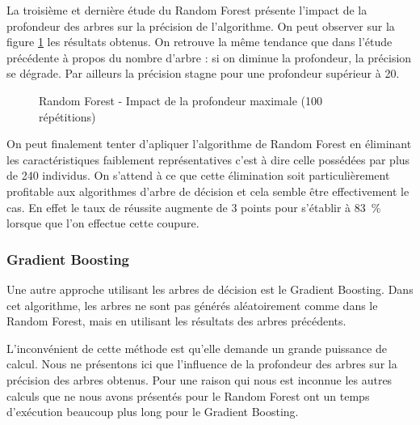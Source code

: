 \documentclass[11pt,a4paper]{article}
\begin{document}
			La troisième et dernière étude du Random Forest présente l'impact de la profondeur des arbres sur la précision de l'algorithme. On peut observer sur la figure \ref{rf_depth} les résultats obtenus. On retrouve la même tendance que dans l'étude précédente à propos du nombre d'arbre : si on diminue la profondeur, la précision se dégrade. Par ailleurs la précision stagne pour une profondeur supérieur à 20.

			\begin{figure}
				\begin{center}
					\caption{Random Forest - Impact de la profondeur maximale (100 répétitions)}
					\label{rf_depth}
				\end{center}
			\end{figure}

			On peut finalement tenter d'apliquer l'algorithme de Random Forest en éliminant les caractéristiques faiblement représentatives c'est à dire celle possédées par plus de 240 individus. On s'attend à ce que cette élimination soit particulièrement profitable aux algorithmes d'arbre de décision et cela semble être effectivement le cas. En effet le taux de réussite augmente de 3 points pour s'établir à \SI{83}{\percent} lorsque que l'on effectue cette coupure.

		\subsubsection{Gradient Boosting}

			Une autre approche utilisant les arbres de décision est le Gradient Boosting. Dans cet algorithme, les arbres ne sont pas générés aléatoirement comme dans le Random Forest, mais en utilisant les résultats des arbres précédents.

			L'inconvénient de cette méthode est qu'elle demande un grande puissance de calcul. Nous ne présentons ici que l'influence de la profondeur des arbres sur la précision des arbres obtenus. Pour une raison qui nous est inconnue les autres calculs que ne nous avons présentés pour le Random Forest ont un temps d'exécution beaucoup plus long pour le Gradient Boosting.
\end{document}
